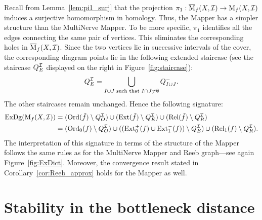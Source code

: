 Recall from Lemma~\ref{lem:pi1_surj} that the projection
$\pi_1:\overline{\mathrm{M}}_f(X,\mathcal{I})\to \mathrm{M}_f(X,\mathcal{I})$ induces a surjective
homomorphism in homology. Thus, the Mapper has a simpler structure
than the MultiNerve Mapper. To be more specific, $\pi_1$ identifies all the 
edges connecting the same pair of vertices. This eliminates the corresponding 
holes in $\overline{\mathrm{M}}_f(X,\mathcal{I})$. Since the two vertices
lie in successive intervals of the cover, the corresponding diagram points lie 
in the following extended staircase 
(see the staircase $Q^{\mathcal{I}}_E$ displayed on the right in Figure~\ref{fig:staircase}):
%
\[
Q_E^{\mathcal I}=\bigcup_{I\cup J \text{ such that } I\cap J\neq \emptyset}Q_{I\cup J}^-.
\]
%
The other staircases remain unchanged. Hence the following signature:
%
\begin{align}\label{eq:sign_Mapper}
\begin{split}
\mathrm{ExDg}(\mathrm{M}_f(X,\mathcal{I}))&=
(\mathrm{Ord}(\tilde{f})\setminus Q_O^{\mathcal{I}})\cup
(\mathrm{Ext}(\tilde{f})\setminus Q_{E}^{\mathcal{I}})\cup
(\mathrm{Rel}(\tilde{f})\setminus Q_R^{\mathcal{I}})\\
&=
(\mathrm{Ord}_0(f)\setminus Q_O^{\mathcal{I}})\cup
((\mathrm{Ext}_0^+(f)\cup \mathrm{Ext}_1^-(f))\setminus Q_{E}^{\mathcal{I}})\cup
(\mathrm{Rel}_1(f)\setminus Q_R^{\mathcal{I}}).
\end{split}
\end{align}
%
The interpretation of this signature in terms of the structure of the
Mapper follows the same rules as for the MultiNerve Mapper and Reeb
graph---see again Figure~\ref{fig:ExDict}.
Moreover, the convergence result stated in
Corollary~\ref{cor:Reeb_approx} holds for the Mapper as well.



















\section{Stability in the bottleneck distance}
\label{sec:Stab_func}

